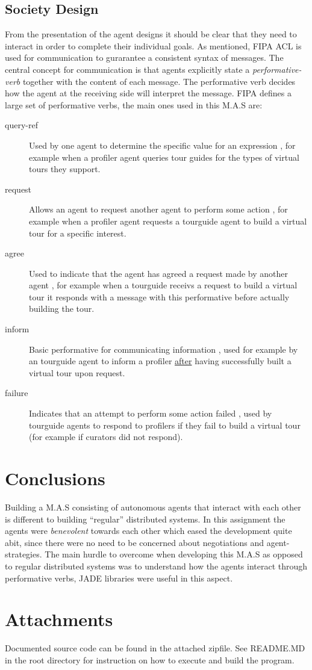 \documentclass[a4paper, 11pt]{article}
\begin{document}
\subsection*{Society Design}
From the presentation of the agent designs it should be clear that they need to interact in order to complete their individual goals. As mentioned, FIPA ACL is used for communication to gurarantee a consistent syntax of messages. The central concept for communication is that agents explicitly state a \textit{performative-verb} together with the content of each message. The performative verb decides how the agent at the receiving side will interpret the message. FIPA defines a large set of performative verbs, the main ones used in this M.A.S are:
\begin{description}
\item[query-ref] Used by one agent to determine the specific value for an expression \citep{coursebook}, for example when a profiler agent queries tour guides for the types of virtual tours they support.
\item[request] Allows an agent to request another agent to perform some action \citep{coursebook}, for example when a profiler agent requests a tourguide agent to build a virtual tour for a specific interest.
\item[agree] Used to indicate that the agent has agreed a request made by another agent \citep{coursebook}, for example when a tourguide receivs a request to build a virtual tour it responds with a message with this performative before actually building the tour.
\item[inform] Basic performative for communicating information \citep{coursebook}, used for example by an tourguide agent to inform a profiler \underline{after} having successfully built a virtual tour upon request.
\item[failure] Indicates that an attempt to perform some action failed \citep{coursebook}, used by tourguide agents to respond to profilers if they fail to build a virtual tour (for example if curators did not respond).
\end{description}
\section*{Conclusions}
Building a M.A.S consisting of autonomous agents that interact with each other is different to building ``regular'' distributed systems. In this assignment the agents were \textit{benevolent} towards each other which eased the development quite abit, since there were no need to be concerned about negotiations and agent-strategies. The main hurdle to overcome when developing this M.A.S as opposed to regular distributed systems was to understand how the agents interact through performative verbs, JADE libraries were useful in this aspect.

\section*{Attachments}
Documented source code can be found in the attached zipfile. See README.MD in the root directory for instruction on how to execute and build the program.

{}

\end{document}
